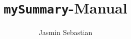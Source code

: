 \documentclass{myReport}
\title{\texttt{mySummary}-Manual}
\author{Jasmin Sebastian}
\begin{document}
\blinddocument
\end{document}
